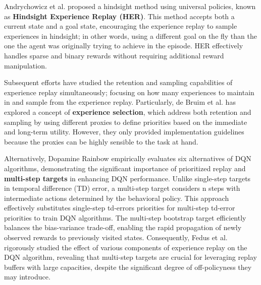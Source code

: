 Andrychowicz et al. \cite{andrychowicz2017hindsight} proposed a hindsight method using universal policies, known as \textbf{Hindsight Experience Replay (HER)}. This method accepts both a current state and a goal state, encouraging the experience replay to sample experiences in hindsight; in other words, using a different goal on the fly than the one the agent was originally trying to achieve in the episode. HER effectively handles sparse and binary rewards without requiring additional reward manipulation. 


Subsequent efforts have studied the retention and sampling capabilities of experience replay simultaneously; focusing on how many experiences to maintain in and sample from the experience replay.  Particularly, de Bruim et al. \cite{de2018experience} has explored a concept of \textbf{experience selection}, which address both retention and sampling by using different proxies to define priorities based on the immediate and long-term utility. However, they only provided implementation guidelines because the proxies can be highly sensible to the task at hand. 


Alternatively, Dopamine Rainbow \cite{hessel2018rainbow} empirically evaluates six alternatives of DQN algorithms, demonstrating the significant importance of prioritized replay and \textbf{multi-step targets} in enhancing DQN performance. Unlike single-step targets in temporal difference (TD) error, a multi-step target considers n steps with intermediate actions determined by the behavioral policy. This approach effectively substitutes single-step td-errors priorities for multi-step td-error priorities to train DQN algorithms. The multi-step bootstrap target \cite{sutton1988learning, sutton2018reinforcement} efficiently balances the bias-variance trade-off, enabling the rapid propagation of newly observed rewards to previously visited states. Consequently, Fedus et al. \cite{fedus2020revisiting} rigorously studied the effect of various components of experience replay on the DQN algorithm, revealing that multi-step targets are crucial for leveraging replay buffers with large capacities, despite the significant degree of off-policyness they may introduce. 


